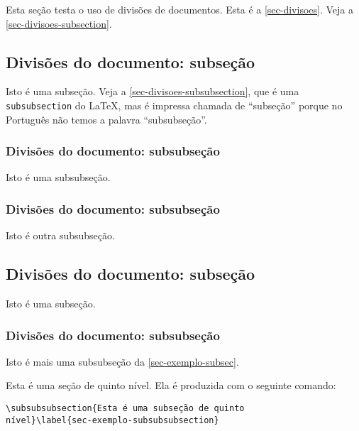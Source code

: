 Esta seção testa o uso de divisões de documentos. Esta é a
\autoref{sec-divisoes}. Veja a \autoref{sec-divisoes-subsection}.

\subsection{Divisões do documento: subseção}\label{sec-divisoes-subsection}

Isto é uma subseção. Veja a \autoref{sec-divisoes-subsubsection}, que é uma
\texttt{subsubsection} do \LaTeX, mas é impressa chamada de ``subseção'' porque
no Português não temos a palavra ``subsubseção''.

\subsubsection{Divisões do documento: subsubseção}
\label{sec-divisoes-subsubsection}

Isto é uma subsubseção.

\subsubsection{Divisões do documento: subsubseção}

Isto é outra subsubseção.

\subsection{Divisões do documento: subseção}\label{sec-exemplo-subsec}

Isto é uma subseção.

\subsubsection{Divisões do documento: subsubseção}

Isto é mais uma subsubseção da \autoref{sec-exemplo-subsec}.


\label{sec-exemplo-subsubsubsection}

Esta é uma seção de quinto nível. Ela é produzida com o seguinte comando:

\begin{verbatim}
\subsubsubsection{Esta é uma subseção de quinto
nível}\label{sec-exemplo-subsubsubsection}
\end{verbatim}

\label{sec-exemplo-subsubsubsection-outro}

